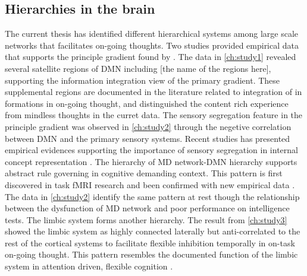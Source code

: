\subsection{Hierarchies in the brain}

The current thesis has identified different hierarchical systems among large scale networks that facilitates on-going thoughts. Two studies provided empirical data that supports the principle gradient found by . The data in \cref{ch:study1} revealed several satellite regions of DMN including [the name of the regions here], supporting the information integration view of the primary gradient. These supplemental regions are documented in the literature related to integration of in formations in on-going thought\cite{Ellamil2016,Karapanagiotidis2017,Smallwood2016}, and distinguished the content rich experience from mindless thoughts in the curret data. The sensory segregation feature in the principle gradient was observed in \cref{ch:study2} through the negetive correlation between DMN and the primary sensory systems. Recent studies has presented empirical evidences supporting the importance of sensory segregation in internal concept representation \cite{Murphy2018,Villena-Gonzalez2018}. The hierarchy of MD network-DMN hierarchy supports abstract rule governing in cognitive demanding context. This pattern is first discovered in task fMRI research \cite{Duncan2010} and been confirmed with new empirical data \cite{Crittenden2016}. The data in \cref{ch:study2} identify the same pattern at rest though the relationship between the dysfunction of MD network and poor performance on intelligence tests. The limbic system forms another hierarchy. The result from \cref{ch:study3} showed the limbic system as highly connected laterally but anti-correlated to the rest of the cortical systems to facilitate flexible inhibition temporally in on-task on-going thought. This pattern resembles the documented function of the limbic system in attention driven, flexible cognition \cite{Kleckner2017}.

